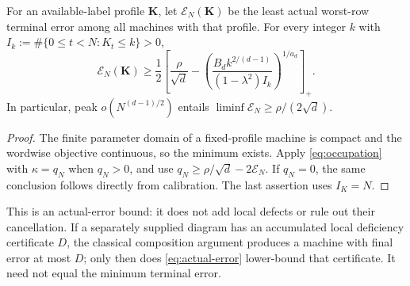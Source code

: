 \begin{corollary}
\label{cor:actual-error}
For an available-label profile $\mathbf K$, let
$\mathcal E_N(\mathbf K)$ be the least actual worst-row terminal error
among all machines with that profile. For every integer $k$ with
$I_k:=\#\{0\le t<N:K_t\le k\}>0$,
\begin{equation}\label{eq:actual-error}
 \mathcal E_N(\mathbf K)\ge\frac12
 \left[\frac\rho{\sqrt d}-
 \left(\frac{B_dk^{2/(d-1)}}{(1-\lambda^2)I_k}\right)^{1/a_d}\right]_+.
\end{equation}
In particular, peak $o(N^{(d-1)/2})$ entails
$\liminf\mathcal E_N\ge\rho/(2\sqrt d)$.
\end{corollary}
\begin{proof}
The finite parameter domain of a fixed-profile machine is compact and
the wordwise objective continuous, so the minimum exists.
Apply \eqref{eq:occupation} with $\kappa=q_N$ when $q_N>0$, and use
$q_N\ge\rho/\sqrt d-2\mathcal E_N$. If $q_N=0$, the same conclusion
follows directly from calibration. The last assertion uses $I_K=N$.
\end{proof}

This is an actual-error bound: it does not add local defects or rule out
their cancellation. If a separately supplied diagram has an accumulated
local deficiency certificate $D$, the classical composition argument
produces a machine with final error at most $D$; only then does
\eqref{eq:actual-error} lower-bound that certificate. It need not equal
the minimum terminal error.
